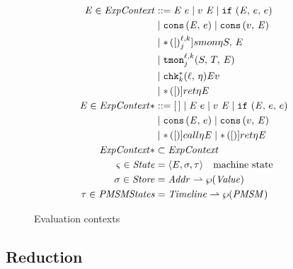 \begin{figure}
\begin{align*}
\mctx{\mmlab} \in \ECtx &::=
      \sapp{\mctx{\mmlab}}{\mexp}
 \alt \sapp{\mval}{\mctx{\mmlab}}
 \alt \sif{\mctx{\mmlab}}{\mexp}{\mexp} \\
&\alt \vcons{\mctx{\mmlab}}{\mexp}
 \alt \vcons{\mval}{\mctx{\mmlab}} \\
&\alt \sSMon{\ell}{k}{j}{\mtimeline}{\mscon}{\mctx*} \\
&\alt \sTMon{\ell}{k}{j}{\mscon}{\mtcon}{\mctx*} \\
&\alt \schk*{k}{\ell}{\mtimeline}{\mctx*}{\mval} \\
&\alt \sret{\ell}{\mtimeline}{\mctx*}
\\
\mctx* \in \ECtx* &::=
      \hole
 \alt \sapp{\mctx*}{\mexp}
 \alt \sapp{\mval}{\mctx*}
 \alt \sif{\mctx*}{\mexp}{\mexp} \\
&\alt \vcons{\mctx*}{\mexp}
 \alt \vcons{\mval}{\mctx*} \\
&\alt \scall{\mmlab}{\mtimeline}{\mctx*}
 \alt \sret{\mmlab}{\mtimeline}{\mctx*} \\
\ECtx* &\subset \ECtx
\\
\mstate \in \State &= \chevron{\mctx{\mmlab}, \msto, \mTMons} \quad\text{machine state}
\\
\msto \in \Store &= \Addr \parto \wp(\Value)
\\
\mTMons \in \TMons &= \Timeline \parto \wp(\PMSM)
\end{align*}
\caption{Evaluation contexts}
\label{fig:ctx}
\end{figure}

\subsection{Reduction} \label{sec:reduction}

